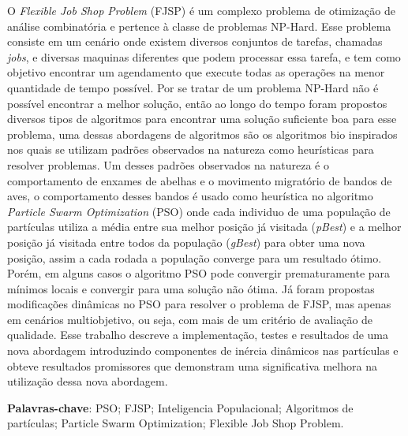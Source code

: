 \par

\begin{resumo}
    O \textit{Flexible Job Shop Problem} (FJSP) é um complexo problema de otimização de análise combinatória e pertence à classe de problemas NP-Hard. Esse problema consiste em um cenário onde existem diversos conjuntos de tarefas, chamadas \textit{jobs}, e diversas maquinas diferentes que podem processar essa tarefa, e tem como objetivo encontrar um agendamento que execute todas as operações na menor quantidade de tempo possível. Por se tratar de um problema NP-Hard não é possível encontrar a melhor solução, então ao longo do tempo foram propostos diversos tipos de algoritmos para encontrar uma solução suficiente boa para esse problema, uma dessas abordagens de algoritmos são os algoritmos bio inspirados nos quais se utilizam padrões observados na natureza como heurísticas para resolver problemas. Um desses padrões observados na natureza é o comportamento de enxames de abelhas e o movimento migratório de bandos de aves, o comportamento desses bandos é usado como heurística no algoritmo \textit{Particle Swarm Optimization} (PSO) onde cada individuo de uma população de partículas utiliza a média entre sua melhor posição já visitada (\textit{pBest}) e a melhor posição já visitada entre todos da população (\textit{gBest}) para obter uma nova posição, assim a cada rodada a população converge para um resultado ótimo. Porém, em alguns casos o algoritmo PSO pode convergir prematuramente para mínimos locais e convergir para uma solução não ótima. Já foram propostas modificações dinâmicas no PSO para resolver o problema de FJSP, mas apenas em cenários multiobjetivo, ou seja, com mais de um critério de avaliação de qualidade. Esse trabalho descreve a implementação, testes e resultados de uma nova abordagem introduzindo componentes de inércia dinâmicos nas partículas e obteve resultados promissores que demonstram uma significativa melhora na utilização dessa nova abordagem.\vspace{\onelineskip}

\noindent\textbf{Palavras-chave}: PSO; FJSP; Inteligencia Populacional; Algoritmos de partículas; Particle Swarm Optimization; Flexible Job Shop Problem.
\end{resumo}
